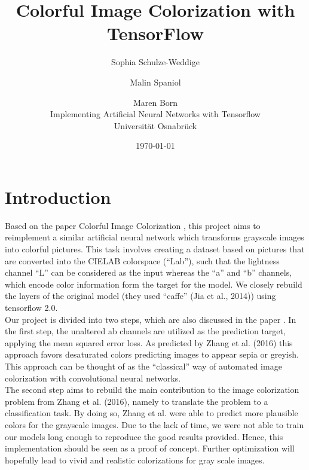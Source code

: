 \documentclass[12pt,letterpaper]{article}
\title{Colorful Image Colorization with TensorFlow}
\date{\today}
\author{Sophia Schulze-Weddige \and Malin Spaniol \and Maren Born \\Implementing Artificial Neural Networks with Tensorflow \\Universität Osnabrück}
\begin{document}
\maketitle
\thispagestyle{empty}
\newpage
\thispagestyle{empty}
\tableofcontents
\newpage
\section{Introduction}
Based on the paper Colorful Image Colorization \citep{Zhang.2016}, this project aims to reimplement a similar artificial neural network which transforms grayscale images into colorful pictures. This task involves creating a dataset based on pictures that are converted into the CIELAB colorspace (\enquote{Lab}), such that the lightness channel \enquote{L} can be considered as the input whereas the \enquote{a} and \enquote{b} channels, which encode color information form the target for the model. We closely rebuild the layers of the original model (they used \enquote{caffe} (Jia et al., 2014)) using tensorflow 2.0.\\
Our project is divided into two steps, which are also discussed in the paper \citep{Zhang.2016}. In the first step, the unaltered ab channels are utilized as the prediction target, applying the mean squared error loss. As predicted by Zhang et al. (2016) this approach favors desaturated colors predicting images to appear sepia or greyish. This approach can be thought of as the \enquote{classical} way of automated image colorization with convolutional neural networks.\\
The second step aims to rebuild the main contribution to the image colorization problem from Zhang et al. (2016), namely to translate the problem to a classification task. By doing so, Zhang et al. were able to predict more plausible colors for the grayscale images. Due to the lack of time, we were not able to train our models long enough to reproduce the good results provided. Hence, this implementation should be seen as a proof of concept. Further optimization will hopefully lead to vivid and realistic colorizations for gray scale images.
\end{document}
